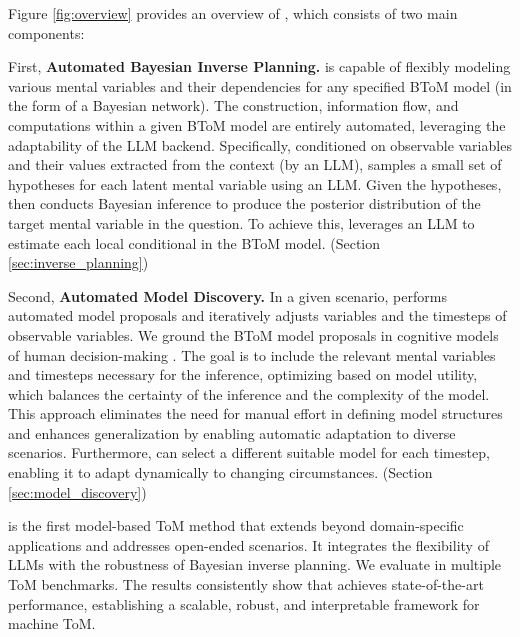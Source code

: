 Figure \ref{fig:overview} provides an overview of \ours, which consists of two main components:


First, \textbf{Automated Bayesian Inverse Planning.} \ours is capable of flexibly modeling various mental variables and their dependencies for any specified BToM model (in the form of a Bayesian network). The construction, information flow, and computations within a given BToM model are entirely automated, leveraging the adaptability of the LLM backend. Specifically, conditioned on observable variables and their values extracted from the context (by an LLM), \ours samples a small set of hypotheses for each latent mental variable using an LLM. Given the hypotheses, \ours then conducts Bayesian inference to produce the posterior distribution of the target mental variable in the question. To achieve this, \ours leverages an LLM to estimate each local conditional in the BToM model. (Section \ref{sec:inverse_planning}) 


Second, \textbf{Automated Model Discovery.} In a given scenario, \ours performs automated model proposals and iteratively adjusts variables and the timesteps of observable variables. We ground the BToM model proposals in cognitive models of human decision-making \citep[e.g.,][]{baker2017rational,ullman2009help}. The goal is to include the relevant mental variables and timesteps necessary for the inference, optimizing based on model utility, which balances the certainty of the inference and the complexity of the model. This approach eliminates the need for manual effort in defining model structures and enhances generalization by enabling automatic adaptation to diverse scenarios. Furthermore, \ours can select a different suitable model for each timestep, enabling it to adapt dynamically to changing circumstances. (Section \ref{sec:model_discovery})


\ours is the first model-based ToM method that extends beyond domain-specific applications and addresses open-ended scenarios. It integrates the flexibility of LLMs with the robustness of Bayesian inverse planning. We evaluate \ours in multiple ToM benchmarks. The results consistently show that \ours achieves state-of-the-art performance, establishing a scalable, robust, and interpretable framework for machine ToM.